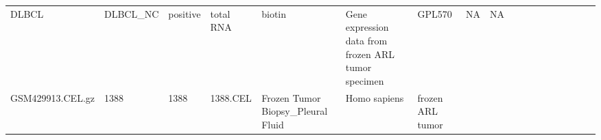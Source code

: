 \documentclass[]{article}
\begin{document}
\begin{longtable}[]{@{}lllllllrllllllllll@{}}
\begin{minipage}[t]{0.06\columnwidth}
DLBCL\strut
\end{minipage} & \begin{minipage}[t]{0.06\columnwidth}\raggedright
DLBCL\_NC\strut
\end{minipage} & \begin{minipage}[t]{0.04\columnwidth}\raggedright
positive\strut
\end{minipage} & \begin{minipage}[t]{0.02\columnwidth}\raggedright
total RNA\strut
\end{minipage} & \begin{minipage}[t]{0.01\columnwidth}\raggedright
biotin\strut
\end{minipage} & \begin{minipage}[t]{0.08\columnwidth}\raggedright
Gene expression data from frozen ARL tumor specimen\strut
\end{minipage} & \begin{minipage}[t]{0.01\columnwidth}\raggedright
GPL570\strut
\end{minipage} & \begin{minipage}[t]{0.00\columnwidth}\raggedright
NA\strut
\end{minipage} & \begin{minipage}[t]{0.01\columnwidth}\raggedright
NA\strut
\end{minipage}\tabularnewline
\begin{minipage}[t]{0.03\columnwidth}\raggedright
GSM429913.CEL.gz\strut
\end{minipage} & \begin{minipage}[t]{0.02\columnwidth}\raggedright
1388\strut
\end{minipage} & \begin{minipage}[t]{0.01\columnwidth}\raggedright
1388\strut
\end{minipage} & \begin{minipage}[t]{0.02\columnwidth}\raggedright
1388.CEL\strut
\end{minipage} & \begin{minipage}[t]{0.06\columnwidth}\raggedright
Frozen Tumor Biopsy\_Pleural Fluid\strut
\end{minipage} & \begin{minipage}[t]{0.02\columnwidth}\raggedright
Homo sapiens\strut
\end{minipage} & \begin{minipage}[t]{0.04\columnwidth}\raggedright
frozen ARL tumor\strut
\end{minipage} & \begin{minipage}[t]{0.05\columnwidth}\raggedleft

\end{minipage}
\end{longtable}
\end{document}
